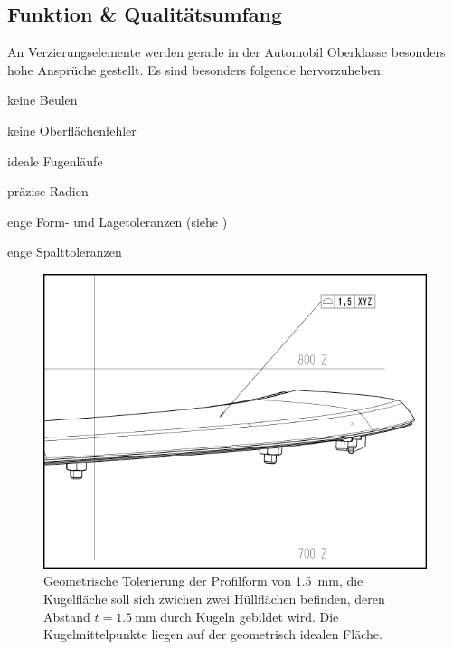 \documentclass[12pt,a4paper,parskip,twoside,BCOR5mm,headsepline]{scrartcl}
\begin{document}
\subsection{Funktion \& Qualitätsumfang}
An Verzierungselemente werden gerade in der Automobil Oberklasse besonders hohe Ansprüche gestellt. Es sind besonders folgende hervorzuheben:
\begin{itemize*}
\item keine Beulen
\item keine Oberflächenfehler
\item ideale Fugenläufe
\item präzise Radien
\item enge Form- und Lagetoleranzen (siehe )
\item enge Spalttoleranzen
\end{itemize*}
\begin{figure}[hbtp]
  \centering
  \includegraphics[width=.8\textwidth]{vdkdtol}
  \caption{Geometrische Tolerierung der Profilform von \SI{1.5}{\milli\meter}, die Kugelfläche soll sich zwichen zwei Hüllflächen befinden, deren Abstand $ t = \SI{1,5}{\milli\meter}$ durch Kugeln gebildet wird. Die Kugelmittelpunkte liegen auf der geometrisch idealen Fläche.\autocite[113]{tm} }
  \label{fig:vdkdtol}
  \end{figure}
  
\end{document}
